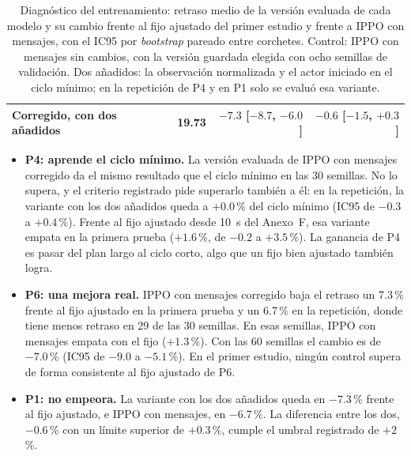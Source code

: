 \begin{table}[H]
\begin{tabular}{lrrr}
Corregido, con dos añadidos & 19.73 & $-7.3$ [$-8.7$, $-6.0$] & $-0.6$ [$-1.5$, $+0.3$] \\
\bottomrule
\end{tabular}
\caption[Diagnóstico del entrenamiento: efecto de las dos correcciones]{Diagnóstico del entrenamiento: retraso medio de la versión evaluada de cada modelo y su cambio frente al fijo ajustado del primer estudio y frente a IPPO con mensajes, con el IC95 por \textit{bootstrap} pareado entre corchetes. Control: IPPO con mensajes sin cambios, con la versión guardada elegida con ocho semillas de validación. Dos añadidos: la observación normalizada y el actor iniciado en el ciclo mínimo; en la repetición de P4 y en P1 solo se evaluó esa variante.}
\label{tab:exploratorio}
\end{table}

\begin{itemize}
  \item \textbf{P4: aprende el ciclo mínimo.} La versión evaluada de
    IPPO con mensajes corregido da el mismo resultado que el ciclo
    mínimo en las 30 semillas. No lo supera, y el criterio registrado
    pide superarlo también a él: en la repetición, la variante con los
    dos añadidos
    queda a $+0.0$\,\% del ciclo mínimo (IC95 de $-0.3$ a $+0.4$\,\%).
    Frente al fijo ajustado desde 10~s del Anexo~F, esa variante empata
    en la primera prueba ($+1.6$\,\%, de $-0.2$ a $+3.5$\,\%). La
    ganancia de P4 es pasar del plan largo al ciclo corto, algo que un
    fijo bien ajustado también logra.
  \item \textbf{P6: una mejora real.} IPPO con mensajes corregido baja
    el retraso un 7.3\,\% frente al fijo ajustado en la primera prueba y
    un 6.7\,\% en la repetición, donde tiene menos retraso en 29 de las
    30 semillas. En esas semillas, IPPO con mensajes empata con el fijo
    ($+1.3$\,\%). Con las 60 semillas el cambio es de $-7.0$\,\% (IC95
    de $-9.0$ a $-5.1$\,\%). En el primer estudio, ningún control supera
    de forma consistente al fijo ajustado de P6.
  \item \textbf{P1: no empeora.} La variante con los dos añadidos queda
    en $-7.3$\,\% frente al fijo ajustado, e IPPO con mensajes, en
    $-6.7$\,\%. La diferencia entre los dos, $-0.6$\,\% con un límite
    superior de $+0.3$\,\%, cumple el umbral registrado de $+2$\,\%.
\end{itemize}

